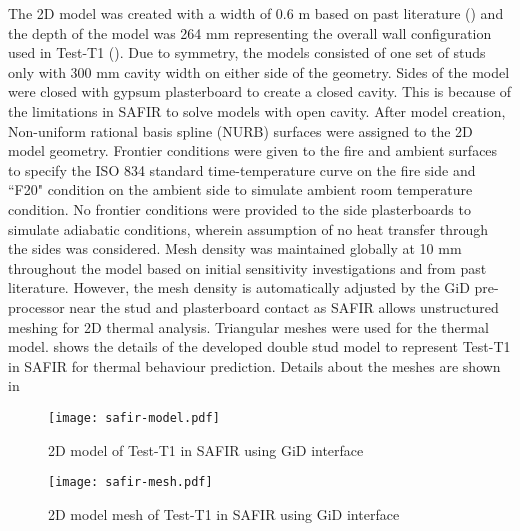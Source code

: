 The 2D model was created with a width of 0.6 m based on past literature (\citet{Keerthan2012a,Keerthan2013}) and the depth of the model was 264 mm representing the overall wall configuration used in Test-T1 (). Due to symmetry, the models consisted of one set of studs only with 300 mm cavity width on either side of the geometry. Sides of the model were closed with gypsum plasterboard to create a closed cavity. This is because of the limitations in SAFIR to solve models with open cavity. After model creation, Non-uniform rational basis spline (NURB) surfaces were assigned to the 2D model geometry. Frontier conditions were given to the fire and ambient surfaces to specify the ISO 834 standard time-temperature curve on the fire side and ``F20" condition on the ambient side to simulate ambient room temperature condition. No frontier conditions were provided to the side plasterboards to simulate adiabatic conditions, wherein assumption of no heat transfer through the sides was considered. Mesh density was maintained globally at 10 mm throughout the model based on initial sensitivity investigations and from past literature. However, the mesh density is automatically adjusted by the GiD pre-processor near the stud and plasterboard contact as SAFIR allows unstructured meshing for 2D thermal analysis. Triangular meshes were used for the thermal model.  shows the details of the developed double stud model to represent Test-T1 in SAFIR for thermal behaviour prediction. Details about the meshes are shown in 
\begin{figure}[!htbp]
	\centering
	\texttt{[image: safir-model.pdf]}
	\caption{2D model of Test-T1 in SAFIR using GiD interface}
	\label{fig:safir-model}
\end{figure}
\begin{figure}[!htbp]
	\centering
	\texttt{[image: safir-mesh.pdf]}
	\caption{2D model mesh of Test-T1 in SAFIR using GiD interface}
	\label{fig:safir-mesh}
\end{figure}

